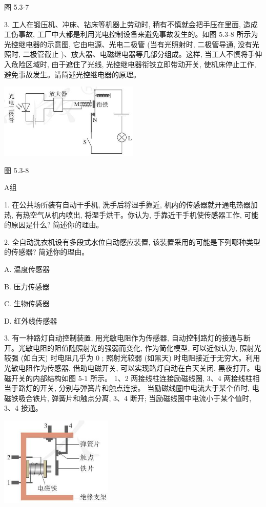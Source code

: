 \documentclass[10pt]{article}
\begin{document}
图 5.3-7

3. 工人在锻压机、冲床、钻床等机器上劳动时, 稍有不慎就会把手压在里面, 造成工伤事故, 工厂中大都是利用光电控制设备来避免事故发生的。如图 5.3-8 所示为光控继电器的示意图, 它由电源、光电二极管 (当有光照射时, 二极管导通, 没有光照时, 二极管截止 )、放大器、电磁继电器等几部分组成。这样, 当工人不慎将手伸入危险区域时, 由于遮住了光线, 光控继电器衔铁立即带动开关, 使机床停止工作, 避免事故发生。请简述光控继电器的原理。

\begin{center}
\includegraphics[max width=0.5\textwidth]{images/01910e72-c5b7-7ed5-a6d4-fb3a5faefc32_112_700881.jpg}
\end{center}

图 5.3-8

A组

1. 在公共场所装有自动干手机, 洗手后将湿手靠近, 机内的传感器就开通电热器加热, 有热空气从机内喷出, 将湿手烘干。你认为, 手靠近干手机使传感器工作, 可能的原因是什么? 简述你的理由。

2. 全自动洗衣机设有多段式水位自动感应装置, 该装置采用的可能是下列哪种类型的传感器? 简述你的理由。

A. 温度传感器

B. 压力传感器

C. 生物传感器

D. 红外线传感器

3. 有一种路灯自动控制装置, 用光敏电阻作为传感器, 自动控制路灯的接通与断开。光敏电阻的阻值随照射光的强弱而变化, 作为简化模型, 可以近似认为, 照射光较强 (如白天) 时电阻几乎为 0 ; 照射光较弱 (如黑天) 时电阻接近于无穷大。利用光敏电阻作为传感器, 借助电磁开关, 可以实现路灯自动在白天关闭, 黑夜打开。电磁开关的内部结构如图 5-1 所示。 1、2 两接线柱连接励磁线圈, 3、4 两接线柱相当于路灯的开关, 分别与弹簧片和触点连接。 当励磁线圈中电流大于某个值时, 电磁铁吸合铁片, 弹簧片和触点分离, 3、4 断开; 当励磁线圈中电流小于某个值时, 3、4 接通。

\begin{center}
\includegraphics[max width=0.4\textwidth]{images/01910e72-c5b7-7ed5-a6d4-fb3a5faefc32_113_639857.jpg}
\end{center}
\end{document}
